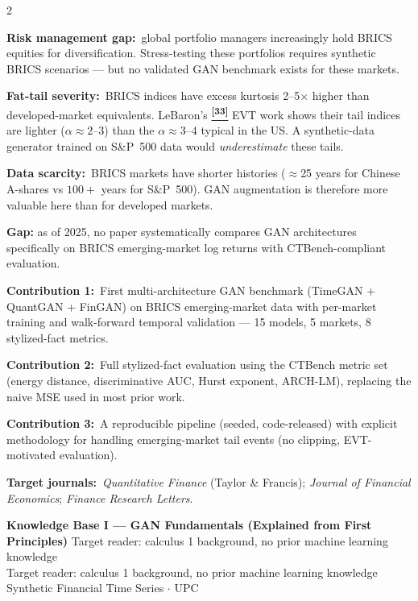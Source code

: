 \documentclass[10pt]{article}
\newcommand{\greenbox}[2]{\begin{tcolorbox}[mybox={FGreen}{GBg},title={#1}]#2\end{tcolorbox}}
\newcommand{\redbox}[2]{\begin{tcolorbox}[mybox={DRed}{RBg},title={#1}]#2\end{tcolorbox}}
\newcommand{\pagehead}[2]{%
  \begin{tcolorbox}[enhanced,arc=0pt,outer arc=0pt,boxrule=0pt,
    colback=Navy,colframe=Navy,
    top=5pt,bottom=5pt,left=8pt,right=8pt,
    before skip=0pt,after skip=10pt]
  {\color{white}\large\bfseries #1}%
  \ifx\relax#2\relax\else\\[1pt]{\color{blue!30!white}\small #2}\fi
  \hfill{\color{blue!20!white}\footnotesize Synthetic Financial Time Series $\cdot$ UPC}
  \end{tcolorbox}}
\newcommand{\tcite}[1]{%
  \hyperlink{R:#1}{\textsuperscript{\scriptsize\textbf{[#1]}}}}
\begin{document}
\begin{multicols}{2}
\columnbreak

\greenbox{Why BRICS? The Scientific Motivation}{%
\textbf{Risk management gap:}\ global portfolio managers increasingly hold BRICS equities for diversification. Stress-testing these portfolios requires synthetic BRICS scenarios --- but no validated GAN benchmark exists for these markets.

\smallskip
\textbf{Fat-tail severity:}\ BRICS indices have excess kurtosis 2--5$\times$ higher than developed-market equivalents. LeBaron's\tcite{33} EVT work shows their tail indices are lighter ($\alpha \approx 2$--$3$) than the $\alpha \approx 3$--$4$ typical in the US. A synthetic-data generator trained on S\&P~500 data would \emph{underestimate} these tails.

\smallskip
\textbf{Data scarcity:}\ BRICS markets have shorter histories ($\approx$25 years for Chinese A-shares vs $100+$ years for S\&P~500). GAN augmentation is therefore more valuable here than for developed markets.}

\redbox{Why This Study Is Publishable: The Journal Pitch}{%
\textbf{Gap:} as of 2025, no paper systematically compares GAN architectures specifically on BRICS emerging-market log returns with CTBench-compliant evaluation.

\textbf{Contribution 1:}\ First multi-architecture GAN benchmark (TimeGAN + QuantGAN + FinGAN) on BRICS emerging-market data with per-market training and walk-forward temporal validation --- 15 models, 5 markets, 8 stylized-fact metrics.

\textbf{Contribution 2:}\ Full stylized-fact evaluation using the CTBench metric set (energy distance, discriminative AUC, Hurst exponent, ARCH-LM), replacing the naive MSE used in most prior work.

\textbf{Contribution 3:}\ A reproducible pipeline (seeded, code-released) with explicit methodology for handling emerging-market tail events (no clipping, EVT-motivated evaluation).

\textbf{Target journals:}\ \textit{Quantitative Finance} (Taylor \& Francis); \textit{Journal of Financial Economics}; \textit{Finance Research Letters}.}

\end{multicols}

\clearpage

\pagehead{Knowledge Base I --- GAN Fundamentals (Explained from First Principles)}
         {Target reader: calculus 1 background, no prior machine learning knowledge}
\end{document}
